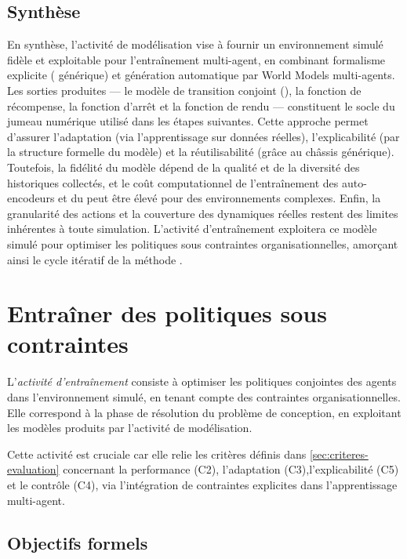 \section{Synthèse}

\noindent
En synthèse, l'activité de modélisation vise à fournir un environnement simulé fidèle et exploitable pour l'entraînement multi-agent, en combinant formalisme explicite ( générique) et génération automatique par World Models multi-agents. Les sorties produites — le modèle de transition conjoint (), la fonction de récompense, la fonction d'arrêt et la fonction de rendu — constituent le socle du jumeau numérique utilisé dans les étapes suivantes. Cette approche permet d'assurer l'adaptation (via l'apprentissage sur données réelles), l'explicabilité (par la structure formelle du modèle) et la réutilisabilité (grâce au châssis générique). Toutefois, la fidélité du modèle dépend de la qualité et de la diversité des historiques collectés, et le coût computationnel de l'entraînement des auto-encodeurs et du  peut être élevé pour des environnements complexes. Enfin, la granularité des actions et la couverture des dynamiques réelles restent des limites inhérentes à toute simulation. L'activité d'entraînement exploitera ce modèle simulé pour optimiser les politiques sous contraintes organisationnelles, amorçant ainsi le cycle itératif de la méthode .

\clearpage
\thispagestyle{empty}
\null
\newpage

\chapter{Entraîner des politiques sous contraintes}
\label{chap:training}

L'\textit{activité d'entraînement} consiste à optimiser les politiques conjointes des agents dans l'environnement simulé, en tenant compte des contraintes organisationnelles.
Elle correspond à la phase de résolution du problème de conception, en exploitant les modèles produits par l'activité de modélisation.

Cette activité est cruciale car elle relie les critères définis dans \autoref{sec:criteres-evaluation} concernant la performance (C2), l'adaptation (C3),l'explicabilité (C5) et le contrôle (C4), via l'intégration de contraintes explicites dans l'apprentissage multi-agent.

\section*{Objectifs formels}

